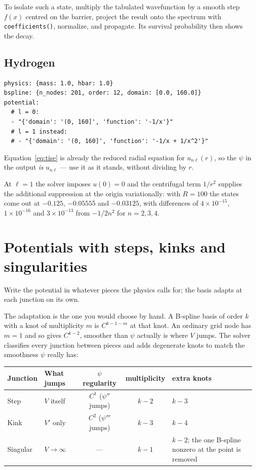 \documentclass[11pt]{article}
\begin{document}
To isolate such a state, multiply the tabulated wavefunction by a smooth step
$f(x)$ centred on the barrier, project the result onto the spectrum with
\texttt{coefficients()}, normalize, and propagate. Its survival probability
then shows the decay.

\subsection*{Hydrogen}
\begin{lstlisting}[style=yaml]
physics: {mass: 1.0, hbar: 1.0}
bspline: {n_nodes: 201, order: 12, domain: [0.0, 160.0]}
potential:
  # l = 0:
  - "{'domain': '(0, 160]', 'function': '-1/x'}"
  # l = 1 instead:
  # - "{'domain': '(0, 160]', 'function': '-1/x + 1/x^2'}"
\end{lstlisting}
Equation~\eqref{eq:tise} is already the reduced radial equation for
$u_{n\ell}(r)$, so the $\psi$ in the output \emph{is} $u_{n\ell}$ --- use it as
it stands, without dividing by $r$.

At $\ell=1$ the solver imposes $u(0)=0$ and the centrifugal term $1/r^{2}$
supplies the additional suppression at the origin variationally: with $R=100$
the states come out at $-0.125$, $-0.0555\overline{5}$ and $-0.03125$, with
differences of $4\times10^{-15}$, $1\times10^{-16}$ and $3\times10^{-13}$ from
$-1/2n^{2}$ for $n=2,3,4$.

\section{Potentials with steps, kinks and singularities}
\label{sec:structure}

Write the potential in whatever pieces the physics calls for; the basis adapts
at each junction on its own.

The adaptation is the one you would choose by hand. A B-spline basis of order
$k$ with a knot of multiplicity $m$ is $C^{k-1-m}$ at that knot. An ordinary
grid node has $m=1$ and so gives $C^{k-2}$, smoother than $\psi$ actually is
where $V$ jumps. The solver classifies every junction between pieces and adds
degenerate knots to match the smoothness $\psi$ really has:

\begin{center}
\begin{tabular}{@{}llccl@{}}
\toprule
Junction & What jumps & $\psi$ regularity & multiplicity & extra knots \\
\midrule
Step  & $V$ itself  & $C^{1}$ ($\psi''$ jumps)   & $k-2$ & $k-3$ \\
Kink  & $V'$ only   & $C^{2}$ ($\psi'''$ jumps)  & $k-3$ & $k-4$ \\
Singular & $V \to \infty$ & --- & $k-1$ & $k-2$; the one B-spline nonzero at the point is removed \\
\bottomrule
\end{tabular}
\end{center}
\end{document}
